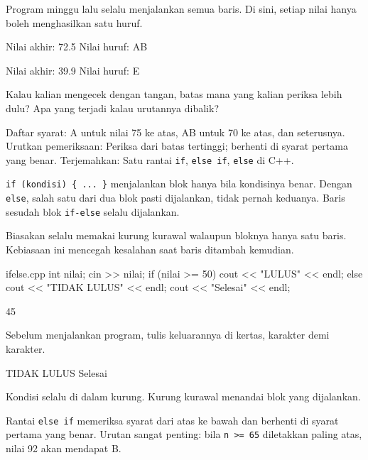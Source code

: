 \documentclass[a4paper]{article}
\begin{document}
Program minggu lalu selalu menjalankan semua baris. Di sini, setiap nilai hanya boleh menghasilkan satu huruf.

\begin{MKeluaran}[title={Tampilan yang diinginkan}]
Nilai akhir: 72.5
Nilai huruf: AB

Nilai akhir: 39.9
Nilai huruf: E
\end{MKeluaran}
\begin{Tebak}
Kalau kalian mengecek dengan tangan, batas mana yang kalian periksa lebih dulu? Apa yang terjadi kalau urutannya dibalik?
\end{Tebak}
\begin{Jawaban}
Daftar syarat: A untuk nilai 75 ke atas, AB untuk 70 ke atas, dan seterusnya. Urutkan pemeriksaan: Periksa dari batas tertinggi; berhenti di syarat pertama yang benar. Terjemahkan: Satu rantai \texttt{if}, \texttt{else if}, \texttt{else} di C++.
\end{Jawaban}
\texttt{if (kondisi) \{ ... \}} menjalankan blok hanya bila kondisinya benar. Dengan \texttt{else}, salah satu dari dua blok pasti dijalankan, tidak pernah keduanya. Baris sesudah blok \texttt{if-else} selalu dijalankan.

Biasakan selalu memakai kurung kurawal walaupun bloknya hanya satu baris. Kebiasaan ini mencegah kesalahan saat baris ditambah kemudian.

\begin{MKode}{ifelse.cpp}
int nilai;
cin >> nilai;
if (nilai >= 50) {
    cout << "LULUS" << endl;
} else {
    cout << "TIDAK LULUS" << endl;
}
cout << "Selesai" << endl;
\end{MKode}
\begin{MKeluaran}[title={Masukan}]
45
\end{MKeluaran}
\begin{Tebak}[]
Sebelum menjalankan program, tulis keluarannya di kertas, karakter demi karakter.
\end{Tebak}
\begin{Jawaban}[]
\begin{MKeluaran}[]
TIDAK LULUS
Selesai
\end{MKeluaran}
Kondisi selalu di dalam kurung. Kurung kurawal menandai blok yang dijalankan.
\end{Jawaban}
Rantai \texttt{else if} memeriksa syarat dari atas ke bawah dan berhenti di syarat pertama yang benar. Urutan sangat penting: bila \texttt{n >= 65} diletakkan paling atas, nilai 92 akan mendapat B.
\end{document}
